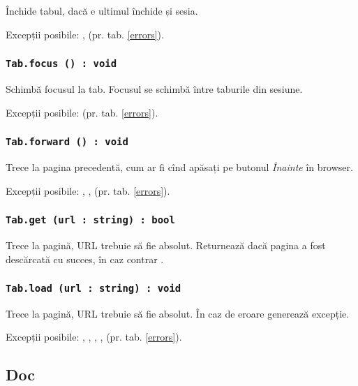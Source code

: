 Închide tabul, dacă e ultimul închide și sesia.

Excepții posibile: ,  (pr. tab. \ref{errors}).

\subsubsection{\texttt{Tab.focus () : void}}

Schimbă focusul la tab. Focusul se schimbă între taburile din sesiune.

Excepții posibile:  (pr. tab. \ref{errors}).

\subsubsection{\texttt{Tab.forward () : void}}

Trece la pagina precedentă, cum ar fi cînd apăsați pe butonul \textit{Înainte} în browser.


Excepții posibile: , ,  (pr. tab. \ref{errors}).

\subsubsection{\texttt{Tab.get (url : string) : bool}}

Trece la pagină, URL trebuie să fie absolut. Returnează \true{} dacă pagina a fost descărcată cu succes, în caz contrar \false.

\subsubsection{\texttt{Tab.load (url : string) : void}}

Trece la pagină, URL trebuie să fie absolut. În caz de eroare generează excepție.

Excepții posibile: , , , ,  (pr. tab. \ref{errors}).

\subsection{{\color{orange} Doc}}

